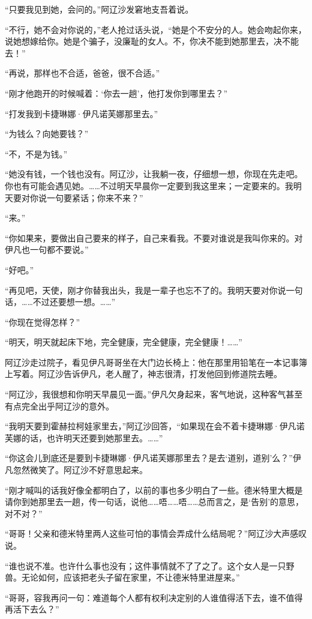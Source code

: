 \par “只要我见到她，会问的。”阿辽沙发窘地支吾着说。
\par “不行，她不会对你说的，”老人抢过话头说，“她是个不安分的人。她会吻起你来，说她想嫁给你。她是个骗子，没廉耻的女人。不，你决不能到她那里去，决不能去！”
\par “再说，那样也不合适，爸爸，很不合适。”
\par “刚才他跑开的时候喊着：‘你去一趟’，他打发你到哪里去？”
\par “打发我到卡捷琳娜·伊凡诺芙娜那里去。”
\par “为钱么？向她要钱？”
\par “不，不是为钱。”
\par “她没有钱，一个钱也没有。阿辽沙，让我躺一夜，仔细想一想，你现在先走吧。你也有可能会遇见她。……不过明天早晨你一定要到我这里来；一定要来的。我明天要对你说一句要紧话；你来不来？”
\par “来。”
\par “你如果来，要做出自己要来的样子，自己来看我。不要对谁说是我叫你来的。对伊凡也一句都不要说。”
\par “好吧。”
\par “再见吧，天使，刚才你替我出头，我是一辈子也忘不了的。我明天要对你说一句话，……不过还要想一想。……”
\par “你现在觉得怎样？”
\par “明天，明天就起床下地，完全健康，完全健康，完全健康！……”
\par 阿辽沙走过院子，看见伊凡哥哥坐在大门边长椅上：他在那里用铅笔在一本记事簿上写着。阿辽沙告诉伊凡，老人醒了，神志很清，打发他回到修道院去睡。
\par “阿辽沙，我很想和你明天早晨见一面。”伊凡欠身起来，客气地说，这种客气甚至有点完全出乎阿辽沙的意外。
\par “我明天要到霍赫拉柯娃家里去，”阿辽沙回答，“如果现在会不着卡捷琳娜·伊凡诺芙娜的话，也许明天还要到她那里去。……”
\par “你这会儿到底还是要到卡捷琳娜·伊凡诺芙娜那里去？是去‘道别，道别’么？”伊凡忽然微笑了。阿辽沙不好意思起来。
\par “刚才喊叫的话我好像全都明白了，以前的事也多少明白了一些。德米特里大概是请你到她那里去一趟，传一句话，说他……唔……唔……总而言之，是‘告别’的意思，对不对？”
\par “哥哥！父亲和德米特里两人这些可怕的事情会弄成什么结局呢？”阿辽沙大声感叹说。
\par “谁也说不准。也许什么事也没有；这件事情就不了了之了。这个女人是一只野兽。无论如何，应该把老头子留在家里，不让德米特里进屋来。”
\par “哥哥，容我再问一句：难道每个人都有权利决定别的人谁值得活下去，谁不值得再活下去么？”
